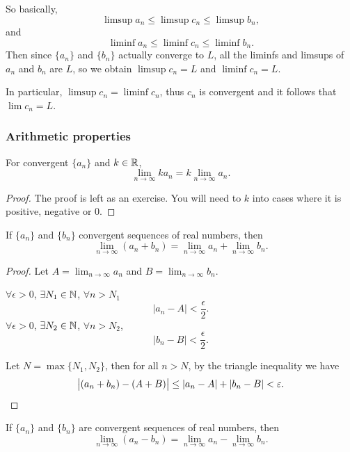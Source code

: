 So basically,
\[ \limsup a_n\le\limsup c_n\le\limsup b_n, \]
and
\[ \liminf a_n\le\liminf c_n\le\liminf b_n. \]
Then since $\{a_n\}$ and $\{b_n\}$ actually converge to $L$, all the liminfs and limsups of $a_n$ and $b_n$ are $L$, so we obtain $\limsup c_n=L$ and $\liminf c_n=L$.

In particular, $\limsup c_n=\liminf c_n$, thus $c_n$ is convergent and it follows that $\lim c_n=L$.

\subsubsection{Arithmetic properties}
\begin{proposition}\label{prop:limit-scalarmultiplication}
For convergent $\{a_n\}$ and $k\in\mathbb R$,
\begin{equation}
\lim_{n\to\infty} ka_n=k\lim_{n\to\infty}a_n.
\end{equation}
\end{proposition}

\begin{proof}
The proof is left as an exercise. You will need to $k$ into cases where it is positive, negative or $0$.
\end{proof}

\begin{proposition}\label{prop:limit-addition}
If $\{a_n\}$ and $\{b_n\}$ convergent sequences of real numbers, then
\begin{equation}
\lim_{n\to\infty}(a_n+b_n)=\lim_{n\to\infty}a_n+\lim_{n\to\infty}b_n.
\end{equation}
\end{proposition}

\begin{proof}
Let $A=\lim_{n\to\infty}a_n$ and $B=\lim_{n\to\infty}b_n$.

$\forall\epsilon>0$, $\exists N_1\in\mathbb N$, $\forall n>N_1$
\[ |a_n-A|<\frac{\epsilon}{2}. \]
$\forall\epsilon>0$, $\exists N_2\in\mathbb N$, $\forall n>N_2$, 
\[ |b_n-B|<\frac{\epsilon}{2}. \]

Let $N=\max\{N_1,N_2\}$, then for all $n>N$, by the triangle inequality we have
\[ \left|(a_n+b_n)-(A+B)\right|\le|a_n-A|+|b_n-B|<\varepsilon. \]
\end{proof}

\begin{corollary}
If $\{a_n\}$ and $\{b_n\}$ are convergent sequences of real numbers, then
\[ \lim_{n\to\infty}(a_n-b_n)=\lim_{n\to\infty}a_n-\lim_{n\to\infty}b_n. \]
\end{corollary}

